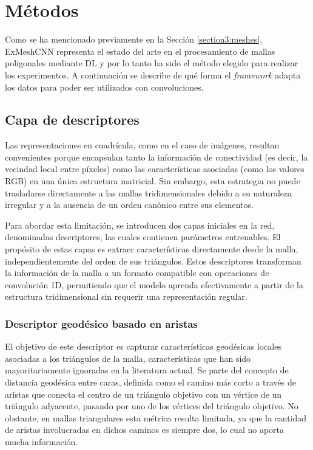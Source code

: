 \section{Métodos}
\label{section4:methods}
Como se ha mencionado previamente en la Sección \ref{section3:meshes}, ExMeshCNN \cite{kim_exmeshcnn_2022} representa el estado del arte en el procesamiento de mallas poligonales mediante DL y por lo tanto ha sido el método elegido para realizar los experimentos. A continuación se describe de qué forma el \textit{framework} adapta los datos para poder ser utilizados con convoluciones.

\subsection{Capa de descriptores}
Las representaciones en cuadrícula, como en el caso de imágenes, resultan convenientes porque encapsulan tanto la información de conectividad (es decir, la vecindad local entre píxeles) como las características asociadas (como los valores RGB) en una única estructura matricial. Sin embargo, esta estrategia no puede trasladarse directamente a las mallas tridimensionales debido a su naturaleza irregular y a la ausencia de un orden canónico entre sus elementos.

Para abordar esta limitación, se introducen dos capas iniciales en la red, denominadas descriptores, las cuales contienen parámetros entrenables. El propósito de estas capas es extraer características directamente desde la malla, independientemente del orden de sus triángulos. Estos descriptores transforman la información de la malla a un formato compatible con operaciones de convolución 1D, permitiendo que el modelo aprenda efectivamente a partir de la estructura tridimensional sin requerir una representación regular.

\subsubsection{Descriptor geodésico basado en aristas}
El objetivo de este descriptor es capturar características geodésicas locales asociadas a los triángulos de la malla, características que han sido mayoritariamente ignoradas en la literatura actual. Se parte del concepto de distancia geodésica entre caras, definida como el camino más corto a través de aristas que conecta el centro de un triángulo objetivo con un vértice de un triángulo adyacente, pasando por uno de los vértices del triángulo objetivo. No obstante, en mallas triangulares esta métrica resulta limitada, ya que la cantidad de aristas involucradas en dichos caminos es siempre dos, lo cual no aporta mucha información.

